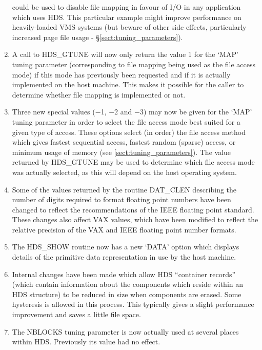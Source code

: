 \begin{enumerate}
could be used to disable file mapping in favour of I/O in any application which
uses HDS. This particular example might improve performance on heavily-loaded
VMS systems (but beware of other side effects, particularly increased page file
usage - \S\ref{sect:tuning_parameters}).

\item
A call to HDS\_GTUNE will now only return the value 1 for the `MAP' tuning
parameter (corresponding to file mapping being used as the file access mode) if
this mode has previously been requested and if it is actually implemented on the
host machine. This makes it possible for the caller to determine whether file
mapping is implemented or not.

\item
Three new special values ($-$1, $-$2 and $-$3) may now be given for the `MAP'
tuning parameter in order to select the file access mode best suited for a given
type of access. These options select (in order) the file access method which
gives fastest sequential access, fastest random (sparse) access, or minimum
usage of memory (see \ref{sect:tuning_parameters}). The value returned by
HDS\_GTUNE may be used to determine which file access mode was actually
selected, as this will depend on the host operating system.

\item
Some of the values returned by the routine DAT\_CLEN describing the number of
digits required to format floating point numbers have been changed to reflect
the recommendations of the IEEE floating point standard. These changes also
affect VAX values, which have been modified to reflect the relative precision of
the VAX and IEEE floating point number formats.

\item
The HDS\_SHOW routine now has a new `DATA' option which displays details of the
primitive data representation in use by the host machine.

\item
Internal changes have been made which allow HDS ``container records'' (which
contain information about the components which reside within an HDS structure)
to be reduced in size when components are erased. Some hysteresis is allowed in
this process. This typically gives a slight performance improvement and saves a
little file space.

\item
The NBLOCKS tuning parameter is now actually used at several places within HDS.
Previously its value had no effect.


\end{enumerate}
